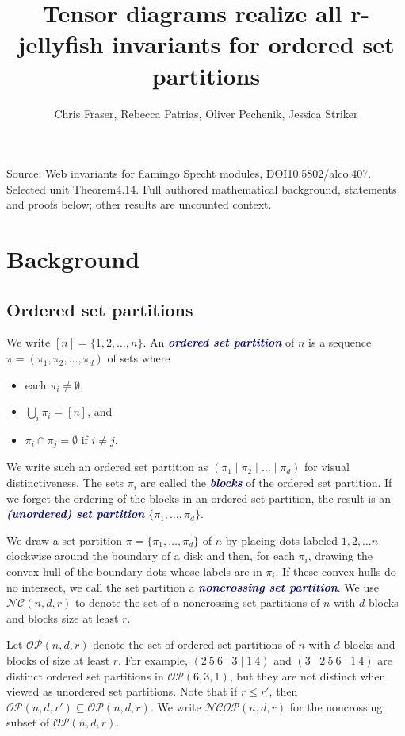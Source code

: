 \documentclass[10pt]{amsart}
\title[Human proof corpus 618]{Tensor diagrams realize all r-jellyfish invariants for ordered set partitions}
\author{Chris Fraser, Rebecca Patrias, Oliver Pechenik, Jessica Striker}
\theoremstyle{definition}
\theoremstyle{plain}
\theoremstyle{plain}
\theoremstyle{definition}
\theoremstyle{remark}
\theoremstyle{plain}
\theoremstyle{plain}
\theoremstyle{plain}
\numberwithin{equation}{section}
\newcommand{\nc}{\mathcal{NC}}
\newcommand{\ncop}{\mathcal{NCOP}}
\newcommand{\ordsetpart}{\mathcal{OP}}
\newcommand{\newword}[1]{\textcolor{darkblue}{\textbf{\emph{#1}}}}
\begin{document}
\maketitle
\noindent Source: Web invariants for flamingo Specht modules, DOI10.5802/alco.407. Selected unit Theorem4.14. Full authored mathematical background, statements and proofs below; other results are uncounted context.
\setcounter{section}{1}\setcounter{figure}{1}
\section{Background}\label{sec:background}
\subsection{Ordered set partitions}\label{sec:set_partitions}
We write $[n] = \{1, 2, \dots, n\}$. An \newword{ordered set partition} of $n$ is a sequence $\pi = (\pi_1, \pi_2, \dots, \pi_d)$ of sets where 
\begin{itemize}
    \item each $\pi_i \neq \emptyset$,
    \item $\bigcup_{i} \pi_i = [n]$, and
    \item $\pi_i \cap \pi_j = \emptyset$ if $i \neq j$.
\end{itemize}
We write such an ordered set partition as 
$(\pi_1 \mid \pi_2 \mid \dots \mid \pi_d)$ for visual distinctiveness. The sets $\pi_i$ are called the \newword{blocks} of the ordered set partition. If we forget the ordering of the blocks in an ordered set partition, the result is an \newword{(unordered) set partition} 
$\{\pi_1, \dots, \pi_d \}$. 


We draw a set partition $\pi = \{\pi_1, \dots, \pi_d \}$ of $n$ by placing dots labeled $1, 2, \dots n$ clockwise around the boundary of a disk and then, for each $\pi_i$, drawing the convex hull of the boundary dots whose labels are in $\pi_i$. If these convex hulls do no intersect, we call the set partition a \newword{noncrossing set partition}. We use $\nc(n,d,r)$ to denote the set of a noncrossing set partitions of $n$ with $d$ blocks and blocks size at least $r$.

Let $\ordsetpart(n,d,r)$ denote the set of ordered set partitions of $n$ with $d$ blocks and blocks of size at least $r$. For example, $(2~5~6\mid 3 \mid 1~4)$ and $(3\mid 2~5~6 \mid 1~4)$ are distinct ordered set partitions in $\ordsetpart(6,3,1)$, but they are not distinct when viewed as unordered set partitions. Note that if $r \leq r'$, then $\ordsetpart(n,d,r') \subseteq \ordsetpart(n,d,r)$. We write $\ncop(n,d,r)$ for the noncrossing subset of $\ordsetpart(n,d,r)$.
\end{document}
